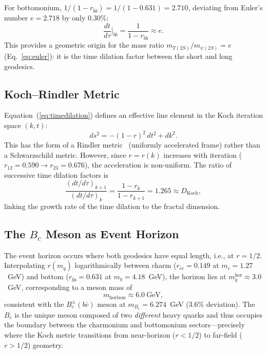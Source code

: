 \documentclass[twocolumn,showpacs,preprintnumbers,amsmath,amssymb,prl]{revtex4-2}
\begin{document}
For bottomonium, $1/(1-r_{\bar{b}b}) = 1/(1-0.631) = 2.710$, deviating
from Euler's number $e = 2.718$ by only $0.30\%$:
\begin{equation}
    \frac{dt}{d\tau}\bigg|_{\bar{b}b} = \frac{1}{1-r_{\bar{b}b}} \approx e.
    \label{eq:euler_dilation}
\end{equation}
This provides a geometric origin for the mass ratio
$m_{\Upsilon(2S)}/m_{\psi(2S)} = e$ (Eq.~\ref{eq:euler}):
it is the time dilation factor between the short and long geodesics.

\subsection{Koch--Rindler Metric}

Equation~(\ref{eq:timedilation}) defines an effective line element in the
Koch iteration space $(k, t)$:
\begin{equation}
    ds^2 = -(1-r)^2\, dt^2 + dk^2.
    \label{eq:kochmetric}
\end{equation}
This has the form of a Rindler metric~\cite{Rindler} (uniformly
accelerated frame) rather than a Schwarzschild metric. However, since
$r = r(k)$ increases with iteration ($r_{12} = 0.590 \to r_{23} = 0.676$),
the acceleration is non-uniform. The ratio of successive time dilation
factors is
\begin{equation}
    \frac{(dt/d\tau)_{k+1}}{(dt/d\tau)_k}
    = \frac{1-r_k}{1-r_{k+1}} = 1.265 \approx D_{\text{Koch}},
\end{equation}
linking the growth rate of the time dilation to the fractal dimension.

\subsection{The $B_c$ Meson as Event Horizon}

The event horizon occurs where both geodesics have equal length, i.e.,
at $r = 1/2$. Interpolating $r(m_q)$ logarithmically between charm
($r_{\bar{c}c} = 0.149$ at $m_c = 1.27$~GeV) and bottom
($r_{\bar{b}b} = 0.631$ at $m_b = 4.18$~GeV), the horizon lies at
$m_q^{\text{hor}} \approx 3.0$~GeV, corresponding to a meson mass of
\begin{equation}
    m_{\text{horizon}} \approx 6.0~\text{GeV},
\end{equation}
consistent with the $B_c^{\pm}(b\bar{c})$ meson at $m_{B_c} = 6.274$~GeV
(3.6\% deviation). The $B_c$ is the unique meson composed of two
\emph{different} heavy quarks and thus occupies the boundary between
the charmonium and bottomonium sectors---precisely where the Koch metric
transitions from near-horizon ($r < 1/2$) to far-field ($r > 1/2$) geometry.
\end{document}
